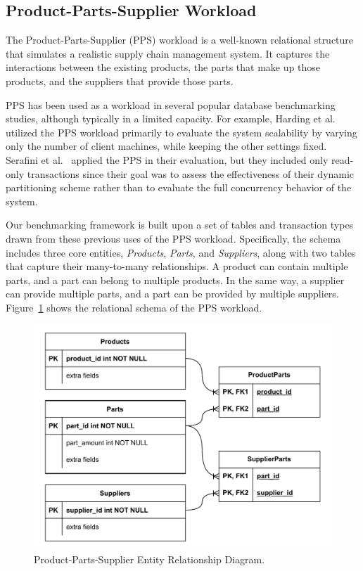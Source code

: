 \subsection{Product-Parts-Supplier Workload}
\label{subsec: product-parts-supplier-workload}
The Product-Parts-Supplier (PPS) workload is a well-known relational structure that simulates a realistic supply chain management system. It captures the interactions between the existing products, the parts that make up those products, and the suppliers that provide those parts.

PPS has been used as a workload in several popular database benchmarking studies, although typically in a limited capacity. For example, Harding et al.~\cite{harding2017evaluation} utilized the PPS workload primarily to evaluate the system scalability by varying only the number of client machines, while keeping the other settings fixed. Serafini et al.~\cite{serafini2016clay} applied the PPS in their evaluation, but they included only read-only transactions since their goal was to assess the effectiveness of their dynamic partitioning scheme rather than to evaluate the full concurrency behavior of the system.

Our benchmarking framework is built upon a set of tables and transaction types drawn from these previous uses of the PPS workload. Specifically, the schema includes three core entities, \textit{Products}, \textit{Parts}, and \textit{Suppliers}, along with two tables that capture their many-to-many relationships. A product can contain multiple parts, and a part can belong to multiple products. In the same way, a supplier can provide multiple parts, and a part can be provided by multiple suppliers. Figure~\ref{fig: pps-erd} shows the relational schema of the PPS workload.

\begin{figure}[ht]
    \centering
    \includegraphics[width=1\linewidth]{figures/PPS ERD.pdf}
    \caption{Product-Parts-Supplier Entity Relationship Diagram.}
    \label{fig: pps-erd}
\end{figure}

